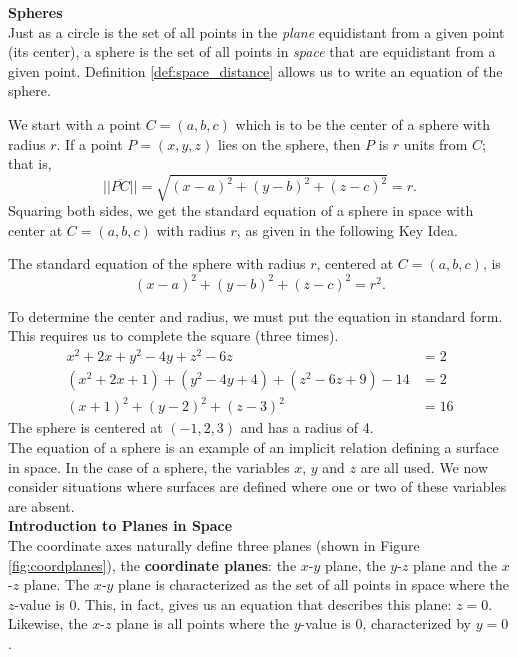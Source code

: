 \noindent\textbf{\large Spheres}\\

Just as a circle is the set of all points in the \textit{plane} equidistant from a given point (its center), a sphere is the set of all points in \textit{space} that are equidistant from a given point. Definition \ref{def:space_distance} allows us to write an equation of the sphere.

We start with a point $C = (a,b,c)$ which is to be the center of a sphere with radius $r$. If a point $P=(x,y,z)$ lies on the sphere, then $P$ is $r$ units from $C$; that is, 
$$||\overline{PC}|| = \sqrt{(x-a)^2+(y-b)^2+(z-c)^2} = r.$$
Squaring both sides, we get the standard equation of a sphere in space with center at $C=(a,b,c)$ with radius $r$, as given in the following Key Idea.

{The standard equation of the sphere with radius $r$, centered at $C=(a,b,c)$, is
$$(x-a)^2+(y-b)^2+(z-c)^2=r^2.$$
}

{To determine the center and radius, we must put the equation in standard form. This requires us to complete the square (three times).
\begin{align*}
x^2+2x+y^2-4y+z^2-6z&=2 \\
(x^2+2x+1) + (y^2-4y+4)+ (z^2-6z+9) - 14 &= 2\\
(x+1)^2 + (y-2)^2 + (z-3)^2 &= 16
\end{align*}
The sphere is centered at $(-1,2,3)$ and has a radius of 4.
}\\

The equation of a sphere is an example of an implicit relation defining a surface in space. In the case of a sphere, the variables $x$, $y$ and $z$ are all used. We now consider situations where surfaces are defined where one or two of these variables are absent.\\

\noindent\textbf{\large Introduction to Planes in Space}\\

The coordinate axes naturally define three planes (shown in Figure \ref{fig:coordplanes}), the \textbf{coordinate planes}: the $x$-$y$ plane, the $y$-$z$ plane and the $x$-$z$ plane. The $x$-$y$ plane is characterized as the set of all points in space where the $z$-value is 0. %
This, in fact, gives us an equation that describes this plane: $z=0$. Likewise, the $x$-$z$ plane is all points where the $y$-value is 0, characterized by $y=0$.\\

